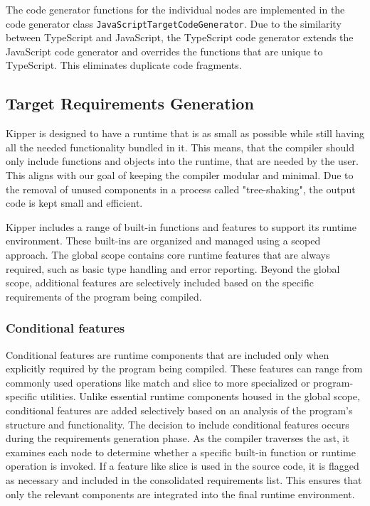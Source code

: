 The code generator functions for the individual nodes are implemented in the code generator class \lstinline|JavaScriptTargetCodeGenerator|. Due to the similarity between TypeScript and JavaScript, the TypeScript code generator extends the JavaScript code generator and overrides the functions that are unique to TypeScript. This eliminates duplicate code fragments.

\subsection{Target Requirements Generation}
\label{sec:requirements}

Kipper is designed to have a runtime that is as small as possible while still having all the needed functionality bundled in it. This means, that the compiler should only include functions and objects into the runtime, that are needed by the user. This aligns with our goal of keeping the compiler modular and minimal. Due to the removal of unused components in a process called "tree-shaking", the output code is kept small and efficient.

Kipper includes a range of built-in functions and features to support its runtime environment. These built-ins are organized and managed using a scoped approach. The global scope contains core runtime features that are always required, such as basic type handling and error reporting. Beyond the global scope, additional features are selectively included based on the specific requirements of the program being compiled.

\subsubsection{Conditional features}

Conditional features are runtime components that are included only when explicitly required by the program being compiled. These features can range from commonly used operations like match and slice to more specialized or program-specific utilities. Unlike essential runtime components housed in the global scope, conditional features are added selectively based on an analysis of the program's structure and functionality. The decision to include conditional features occurs during the requirements generation phase. As the compiler traverses the \acrshort{ast}, it examines each node to determine whether a specific built-in function or runtime operation is invoked. If a feature like slice is used in the source code, it is flagged as necessary and included in the consolidated requirements list. This ensures that only the relevant components are integrated into the final runtime environment.

